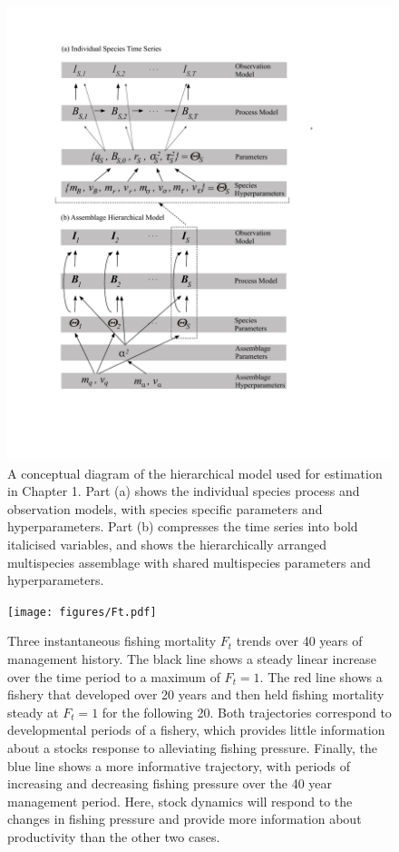 \documentclass[]{scrartcl}
\begin{document}
\begin{figure}[htbp]
\centering
\includegraphics{figures/HBMClarkCh1.pdf}
\caption{A conceptual diagram of the hierarchical model used for estimation in Chapter 1.  Part (a) shows the individual species process and observation models, with species specific parameters and hyperparameters. Part (b) compresses the time series into bold italicised variables, and shows the hierarchically arranged multispecies assemblage with shared multispecies parameters and hyperparameters.}\label{fig:HBMCh1}
\end{figure}

\newpage

\begin{figure}[htbp]
\centering
\texttt{[image: figures/Ft.pdf]}
\caption{Three instantaneous fishing mortality $F_t$ trends over 40 years of management history. The black line shows a steady linear increase over the time period to a maximum of $F_t = 1$. The red line shows a fishery that developed over 20 years and then held fishing mortality steady at $F_t = 1$ for the following 20. Both trajectories correspond to developmental periods of a fishery, which provides little information about a stocks response to alleviating fishing pressure. Finally, the blue line shows a more informative trajectory, with periods of increasing and decreasing fishing pressure over the 40 year management period. Here, stock dynamics will respond to the changes in fishing pressure and provide more information about productivity than the other two cases.}\label{fig:HBMCh1}
\end{figure}
\end{document}
